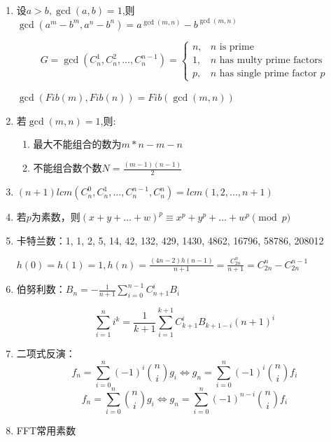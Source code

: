 \documentclass[twoside]{article}
\begin{document}
\begin{enumerate}
    \item 设$a>b,\gcd(a,b)=1$,则$\gcd(a^m-b^m,a^n-b^n)=a^{\gcd(m,n)}-b^{\gcd(m,n)}$
    
    $$
    G=\gcd(C_n^1,C_n^2,...,C_n^{n-1})=
    \begin{cases}
        n, & \text{$n$ is prime} \\
        1, & \text{$n$ has multy prime factors} \\
        p, & \text{$n$ has single prime factor $p$}
    \end{cases}
    $$
    
    $\gcd(Fib(m),Fib(n))=Fib(\gcd(m,n))$
    
    \item 若$\gcd(m,n)=1$,则:
    
    \begin{enumerate}
    \item 最大不能组合的数为$m*n-m-n$
    \item 不能组合数个数$N=\frac{(m-1)(n-1)}{2}$
    \end{enumerate}
    
    \item $(n+1)lcm(C_n^0,C_n^1,...,C_n^{n-1},C_n^{n})=lcm(1,2,...,n+1)$
    
    \item 若$p$为素数，则$(x+y+...+w)^p\equiv x^p+y^p+...+w^p\pmod p$
    
    \item 卡特兰数：1, 1, 2, 5, 14, 42, 132, 429, 1430, 4862, 16796, 58786, 208012
    
    $h(0)=h(1)=1,h(n)=\frac{(4n-2)h(n-1)}{n+1}=\frac{C_{2n}^n}{n+1}=C_{2n}^n-C_{2n}^{n-1}$
    
    \item 伯努利数：$B_n = -\frac{1}{n+1} \sum_{i=0}^{n-1} C_{n+1}^i B_i$
    
    $$\sum_{i=1}^n i^k = \frac{1}{k+1} \sum_{i=1}^{k+1}C_{k+1}^i B_{k+1-i}(n+1)^i$$
    
    \item 二项式反演：$$f_n = \sum_{i = 0} ^ n (-1) ^ i \binom{n}{i} g_i \Leftrightarrow g_n = \sum_{i = 0} ^ n (-1) ^ i \binom{n}{i} f_i$$
    $$f_n = \sum_{i = 0} ^ n \binom{n}{i} g_i \Leftrightarrow g_n = \sum_{i = 0} ^ n (-1) ^ {n - i} \binom{n}{i} f_i$$
    
    
    \item FFT常用素数
    

\end{enumerate}
\end{document}
